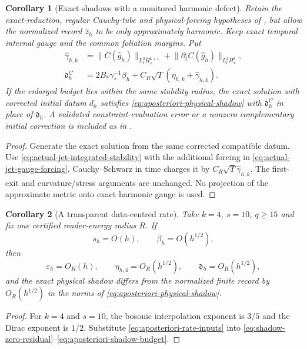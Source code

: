 \documentclass[11pt]{article}
\numberwithin{equation}{section}
\newtheorem{corollary}[corollary]{Corollary}
\theoremstyle{definition}
\theoremstyle{remark}
\newcommand{\norm}[1]{\lVert#1\rVert}
\begin{document}
\begin{corollary}[Exact shadows with a monitored harmonic defect]
\label{cor:shadow-harmonic-defect}
Retain the exact-reduction, regular Cauchy-tube and physical-forcing
hypotheses of , but allow the normalized
record $\widehat z_h$ to be only approximately harmonic. Keep exact temporal
internal gauge and the common foliation margins. Put
\begin{equation}
 \begin{aligned}
 \widehat\gamma_{h,k}
 &=\norm{C(\widehat g_h)}_{L_t^2H_x^{k+1}}
       +\norm{\partial_tC(\widehat g_h)}_{L_t^2H_x^k},\\
 \mathfrak d_h^C
 &=2B_*\gamma_*^{-1}\beta_h
       +C_R\sqrt T(\eta_{h,k}+\widehat\gamma_{h,k}).
 \end{aligned}
 \label{eq:shadow-harmonic-budget}
\end{equation}
If the enlarged budget lies within the same stability radius, the exact
solution with corrected initial datum $d_h$ satisfies
\eqref{eq:aposteriori-physical-shadow} with $\mathfrak d_h^C$ in place of
$\mathfrak d_h$. A validated constraint-evaluation error or a nonzero
complementary initial correction is included as in
.
\end{corollary}
\begin{proof}
Generate the exact solution from the same corrected compatible datum.
Use \eqref{eq:actual-jet-integrated-stability} with the additional forcing
in \eqref{eq:actual-jet-gauge-forcing}. Cauchy--Schwarz in time charges it
by $C_R\sqrt T\widehat\gamma_{h,k}$. The first-exit and curvature/stress
arguments are unchanged. No projection of the approximate metric onto
exact harmonic gauge is used.
\end{proof}

\begin{corollary}[A transparent data-centred rate]
\label{cor:aposteriori-shadow-rate}
Take $k=4$, $s=10$, $q\ge15$ and fix one certified reader-energy radius $R$.
If
\begin{equation}
 s_h=O(h),
 \qquad
 \beta_h=O(h^{1/2}),
 \label{eq:aposteriori-rate-inputs}
\end{equation}
then
\begin{equation}
 \varepsilon_h=O_R(h),
 \qquad
 \eta_{h,4}=O_R(h^{1/2}),
 \qquad
 \mathfrak d_h=O_R(h^{1/2}),
 \label{eq:aposteriori-rate-output}
\end{equation}
and the exact physical shadow differs from the normalized finite record by
$O_R(h^{1/2})$ in the norms of
\eqref{eq:aposteriori-physical-shadow}.
\end{corollary}
\begin{proof}
For $k=4$ and $s=10$, the bosonic interpolation exponent is $3/5$ and the
Dirac exponent is $1/2$.  Substitute
\eqref{eq:aposteriori-rate-inputs} into
\eqref{eq:shadow-zero-residual}--\eqref{eq:aposteriori-shadow-budget}.
\end{proof}
\end{document}
